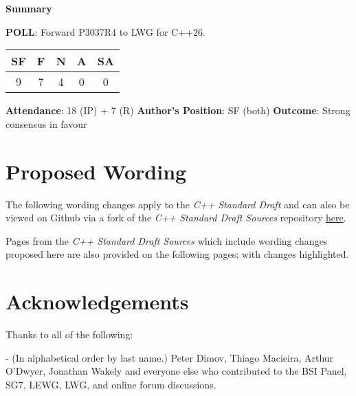 \documentclass[10pt]{article}
\newcommand*{\upstreamcommit}{05300d7}
\newcommand*{\forkcommit}{fb46090}
\begin{document}
\textbf{Summary}

\textbf{POLL}: Forward P3037R4 to LWG for C++26.

\begin{tabular}{|c|c|c|c|c|}
  \hline
  \textbf{SF} & \textbf{F} & \textbf{N} & \textbf{A} & \textbf{SA} \\
  \hline
  9 & 7 & 4 & 0 & 0  \\
  \hline
\end{tabular}

\textbf{Attendance}: 18 (IP) + 7 (R)\newline
\textbf{Author's Position}: SF (both)\newline
\textbf{Outcome}: Strong consensus in favour\newline

\section{Proposed Wording}
\label{sec:wording}

The following wording changes apply to the \emph{C++ Standard Draft} and can
also be viewed on Github via a fork of the \emph{C++ Standard Draft Sources}
repository
\href{https://github.com/cplusplus/draft/compare/\upstreamcommit...pkeir:draft:\forkcommit}{here}.

Pages from the \emph{C++ Standard Draft Sources} which include wording changes
proposed here are also provided on the following pages; with changes
highlighted.



\section{Acknowledgements}

Thanks to all of the following:

  - (In alphabetical order by last name.) Peter Dimov, Thiago Macieira, Arthur O'Dwyer, Jonathan Wakely and everyone else who contributed to the BSI Panel, SG7, LEWG, LWG, and online forum discussions.
\end{document}
